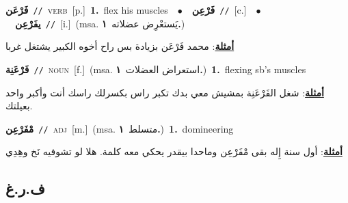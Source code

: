 \documentclass[10pt,a4paper,twoside]{article} %
\begin{document}
\begin{multicols}{2}
{\setlength\topsep{0pt}\textbf{\foreignlanguage{arabic}{فَرْعَن}}\ {\color{gray}\texttt{//}\color{black}}\ \textsc{verb}\ [p.]\ \textbf{1.}~flex his muscles\ \ $\bullet$\ \ \setlength\topsep{0pt}\textbf{\foreignlanguage{arabic}{فَرْعِن}}\ {\color{gray}\texttt{//}\color{black}}\ [c.]\ \ $\bullet$\ \ \setlength\topsep{0pt}\textbf{\foreignlanguage{arabic}{يفَرْعِن}}\ {\color{gray}\texttt{//}\color{black}}\ [i.]\ \color{gray}(msa. \foreignlanguage{arabic}{يَستعْرِض عضلاته}~\foreignlanguage{arabic}{\textbf{١.}})\color{black}\  \begin{flushright}\color{gray}\foreignlanguage{arabic}{\textbf{\underline{\foreignlanguage{arabic}{أمثلة}}}: محمد فَرْعَن بزيادة بس راح أخوه الكبير يشتغل غربا}\end{flushright}\color{black}} \vspace{2mm}

{\setlength\topsep{0pt}\textbf{\foreignlanguage{arabic}{فَرْعَنِة}}\ {\color{gray}\texttt{//}\color{black}}\ \textsc{noun}\ [f.]\ \color{gray}(msa. \foreignlanguage{arabic}{استعراض العضلات}~\foreignlanguage{arabic}{\textbf{١.}})\color{black}\ \textbf{1.}~flexing sb's muscles\  \begin{flushright}\color{gray}\foreignlanguage{arabic}{\textbf{\underline{\foreignlanguage{arabic}{أمثلة}}}: شغل الفَرْعَنِة بمشيش معي بدك تكبر راس بكسرلك راسك أنت وأكبر واحد بعيلتك.}\end{flushright}\color{black}} \vspace{2mm}

{\setlength\topsep{0pt}\textbf{\foreignlanguage{arabic}{مْفَرْعِن}}\ {\color{gray}\texttt{//}\color{black}}\ \textsc{adj}\ [m.]\ \color{gray}(msa. \foreignlanguage{arabic}{متسلط}~\foreignlanguage{arabic}{\textbf{١.}})\color{black}\ \textbf{1.}~domineering\  \begin{flushright}\color{gray}\foreignlanguage{arabic}{\textbf{\underline{\foreignlanguage{arabic}{أمثلة}}}: أول سنة إِله بقى مْفَرْعِن وماحدا بيقدر يحكي معه كلمة. هلا لو تشوفيه نَخ وهِدِي}\end{flushright}\color{black}} \vspace{2mm}

\vspace{-3mm}
\subsection*{\color{blue}\foreignlanguage{arabic}{ف.ر.غ}\color{blue}{}} 


\end{multicols}
\end{document}
